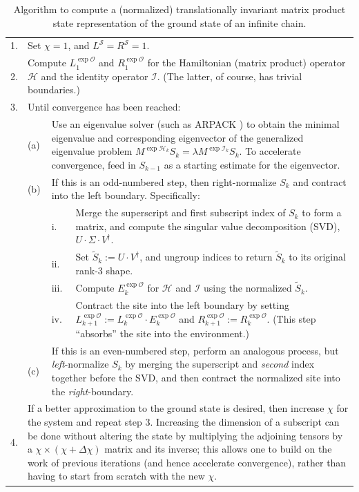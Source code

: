 \documentclass[12pt]{amsbook}
\theoremstyle{plain}
\theoremstyle{definition}
\theoremstyle{remark}
\newcommand{\mexp}[1]{\exp{\mathcal{#1}}}
\begin{document}
\begin{table}
\begin{tabular}{p{0.075in}p{0.15in}p{0.1in}p{2.8in}}
1. & \multicolumn{3}{p{3.3in}}{Set $\chi=1$, and $L^{\mathcal{S}}=R^{\mathcal{S}}=1$.} \\
2. & \multicolumn{3}{p{3.3in}}{Compute $L_1^{\mexp{O}}$ and $R_1^{\mexp{O}}$ for the Hamiltonian
(matrix product)
operator $\mathcal{H}$ and the identity operator $\mathcal{I}$.
(The latter, of course, has trivial boundaries.)
} \\
3. & \multicolumn{3}{p{3.3in}}{Until convergence has been reached:} \\
   & (a) & \multicolumn{2}{p{2.9in}}{Use an eigenvalue solver (such as ARPACK \cite{arpack}) to obtain the minimal eigenvalue and corresponding eigenvector of the generalized eigenvalue problem $M^{\mexp{H}_k}S_k = \lambda M^{\mexp{I}_k} S_k.$  To accelerate convergence, feed in $S_{k-1}$ as a starting estimate for the eigenvector.
} \\
   & (b) & \multicolumn{2}{p{2.9in}}{If this is an odd-numbered step, then right-normalize $S_k$ and contract into the left boundary.  Specifically:} \\
   &     & i.  & Merge the superscript and first subscript index of $S_k$ to form a matrix, and compute the singular value decomposition (SVD), $U\cdot \Sigma\cdot V^\dagger$. \\
   &     & ii. & Set $\tilde S_k:=U\cdot V^\dagger$, and ungroup indices to return $\tilde S_k$ to its original rank-3 shape. \\
   &     & iii.& Compute $E_k^{\mexp{O}}$ for $\mathcal{H}$ and $\mathcal{I}$ using the normalized $\tilde S_k$. \\
   &     & iv. & Contract the site into the left boundary by setting $L_{k+1}^{\mexp{O}}:=L_{k}^{\mexp{O}}\cdot E^{\mexp{O}}_k$ and $R^{\mexp{O}}_{k+1}:=R_k^{\mexp{O}}$.  (This step ``absorbs'' the site into the environment.) \\
   & (c) & \multicolumn{2}{p{2.9in}}{If this is an even-numbered step, perform an analogous process, but \emph{left}-normalize $S_k$ by merging the superscript and \emph{second} index together before the SVD, and then contract the normalized site into the \emph{right}-boundary.} \\
4. & \multicolumn{3}{p{3.3in}}{If a better approximation to the ground state is desired, then increase $\chi$ for the system and repeat step 3.  Increasing the dimension of a subscript can be done without altering the state by multiplying the adjoining tensors by a $\chi\times (\chi+\Delta\chi)$ matrix and its inverse;  this allows one to build on the work of previous iterations (and hence accelerate convergence), rather than having to start from scratch with the new $\chi$.
}
\end{tabular}
\caption{Algorithm to compute a (normalized) translationally invariant matrix product state representation of the ground state of an infinite chain.}
\label{algorithm}
\end{table}
\end{document}
